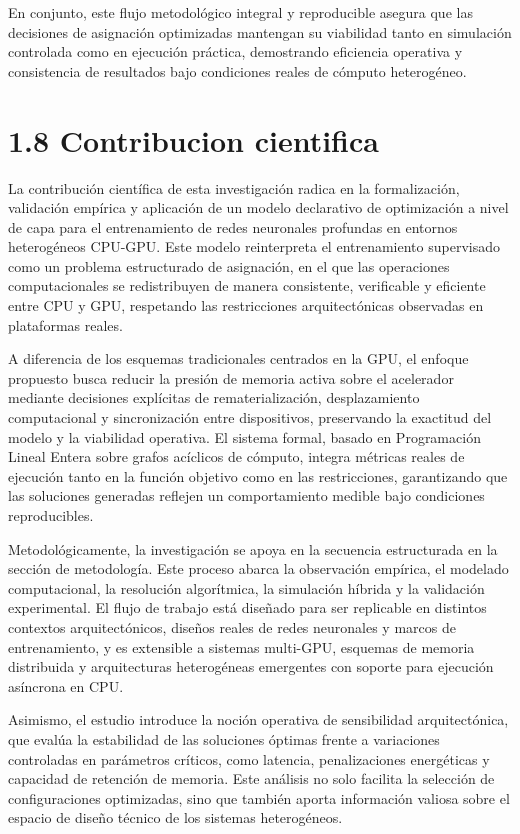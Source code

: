 En conjunto, este flujo metodológico integral y reproducible asegura que las decisiones de asignación optimizadas mantengan su viabilidad tanto en simulación controlada como en ejecución práctica, demostrando eficiencia operativa y consistencia de resultados bajo condiciones reales de cómputo heterogéneo.

\section{1.8 Contribucion cientifica}
La contribución científica de esta investigación radica en la formalización, validación empírica y aplicación de un modelo declarativo de optimización a nivel de capa para el entrenamiento de redes neuronales profundas en entornos heterogéneos CPU-GPU. Este modelo reinterpreta el entrenamiento supervisado como un problema estructurado de asignación, en el que las operaciones computacionales se redistribuyen de manera consistente, verificable y eficiente entre CPU y GPU, respetando las restricciones arquitectónicas observadas en plataformas reales.

A diferencia de los esquemas tradicionales centrados en la GPU, el enfoque propuesto busca reducir la presión de memoria activa sobre el acelerador mediante decisiones explícitas de rematerialización, desplazamiento computacional y sincronización entre dispositivos, preservando la exactitud del modelo y la viabilidad operativa. El sistema formal, basado en Programación Lineal Entera sobre grafos acíclicos de cómputo, integra métricas reales de ejecución tanto en la función objetivo como en las restricciones, garantizando que las soluciones generadas reflejen un comportamiento medible bajo condiciones reproducibles.

Metodológicamente, la investigación se apoya en la secuencia estructurada en la sección de metodología. Este proceso abarca la observación empírica, el modelado computacional, la resolución algorítmica, la simulación híbrida y la validación experimental. El flujo de trabajo está diseñado para ser replicable en distintos contextos arquitectónicos, diseños reales de redes neuronales y marcos de entrenamiento, y es extensible a sistemas multi-GPU, esquemas de memoria distribuida y arquitecturas heterogéneas emergentes con soporte para ejecución asíncrona en CPU.

Asimismo, el estudio introduce la noción operativa de sensibilidad arquitectónica, que evalúa la estabilidad de las soluciones óptimas frente a variaciones controladas en parámetros críticos, como latencia, penalizaciones energéticas y capacidad de retención de memoria. Este análisis no solo facilita la selección de configuraciones optimizadas, sino que también aporta información valiosa sobre el espacio de diseño técnico de los sistemas heterogéneos.

